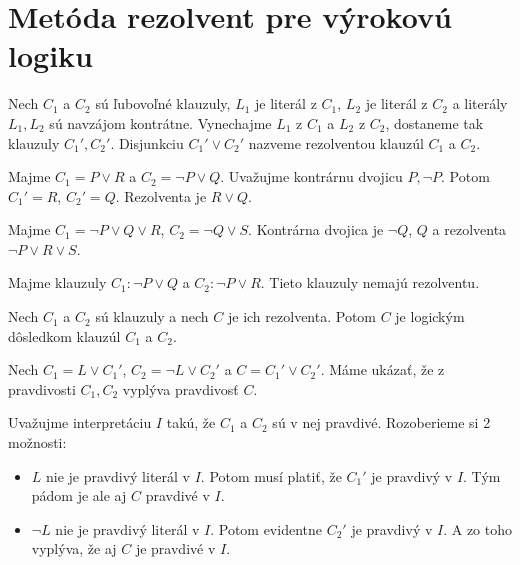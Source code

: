 \section{Metóda rezolvent pre výrokovú logiku}

\begin{definicia}[Rezolventa]
    Nech $C_1$ a $C_2$ sú ľubovoľné klauzuly, 
    $L_1$ je literál z $C_1$, $L_2$ je literál z $C_2$ a literály $L_1,L_2$
    sú navzájom kontrátne. Vynechajme $L_1$ z $C_1$ a $L_2$ z $C_2$,
    dostaneme tak klauzuly $C_1', C_2'$.
    Disjunkciu $C_1' \lor C_2'$ nazveme rezolventou klauzúl $C_1$ a $C_2$.
\end{definicia}

\begin{priklad}
    Majme $C_1 = P \lor R$ a $C_2 = \neg P \lor Q$. Uvažujme kontrárnu dvojicu
    $P,\neg P$. Potom $C_1' = R$, $C_2'=Q$. Rezolventa je $R \lor Q$.
\end{priklad}

\begin{priklad}
    Majme $C_1= \neg P \lor Q\lor R$, $C_2 = \neg Q \lor S$.
    Kontrárna dvojica je $\neg Q$, $Q$ a rezolventa $\neg P \lor R \lor S$.
\end{priklad}

\begin{priklad}
    Majme klauzuly $C_1: \neg P \lor Q$ a  $C_2: \neg P \lor R$.
    Tieto klauzuly nemajú rezolventu.
\end{priklad}

\begin{veta}
    Nech $C_1$ a $C_2$ sú klauzuly a nech $C$ je ich rezolventa.
    Potom $C$ je logickým dôsledkom klauzúl $C_1$ a $C_2$.
\end{veta}
\begin{dokaz}
    Nech $C_1 = L \lor C_1'$, $C_2 = \neg L \lor C_2'$ a 
    $C = C_1' \lor C_2'$.
    Máme ukázať, že z pravdivosti $C_1, C_2$ vyplýva pravdivosť $C$.

    Uvažujme interpretáciu $I$ takú, že $C_1$ a $C_2$ sú v nej pravdivé.
    Rozoberieme si 2 možnosti:
    \begin{itemize}
    \item $L$ nie je pravdivý literál v $I$.
        Potom musí platiť, že $C_1'$ je pravdivý v $I$. Tým pádom je ale aj
        $C$ pravdivé v $I$.

    \item $\neg L$ nie je pravdivý literál v $I$.
        Potom evidentne $C_2'$ je pravdivý v $I$. A zo toho vyplýva, že aj
        $C$ je pravdivé v $I$.
    \end{itemize}
\end{dokaz}

